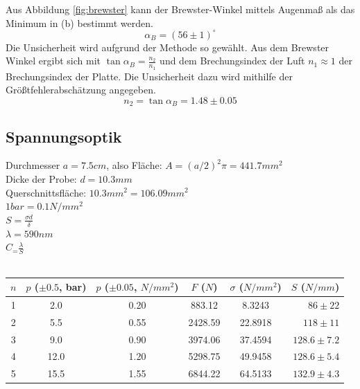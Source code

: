 \documentclass[twoside]{article}
\begin{document}
Aus Abbildung \ref{fig:brewster} kann der Brewster-Winkel mittels Augenmaß als das Minimum in (b) bestimmt werden.
$$\boxed{\alpha_B=(56 \pm 1)^\circ}$$
Die Unsicherheit wird aufgrund der Methode so gewählt.
Aus dem Brewster Winkel ergibt sich mit $\tan \alpha_B=\frac{n_2}{n_1}$ und dem Brechungsindex der Luft $n_1 \approx 1$ der Brechungsindex der Platte. Die Unsicherheit dazu wird mithilfe der Größtfehlerabschätzung angegeben.
$$\boxed{n_2=\tan \alpha_B=1.48 \pm 0.05}$$



\subsection{Spannungsoptik}
Durchmesser $a=7.5cm$, also Fläche: $A=(a/2)^2\pi=441.7mm^2$\\
Dicke der Probe: $d=10.3mm$\\
Querschnittsfläche: $10.3mm^2=106.09mm^2$\\
$1 bar = 0.1 N/mm^2$\\
$S=\frac{\sigma d}{\delta}$\\
$\lambda=590nm$\\
$C_=\frac{\lambda}{S}$\\
\\
\begin{table}[H]
\begin{center}
\begin{tabular}{|c|c|c|c|c|r|}
\hline
$n$ & $p$ ($\pm 0.5$, bar) & $p$ ($\pm 0.05$, $\si{N/mm^2}$) & $F$ ($N$) & $\sigma$ ($\si{N/mm^2}$) & $S$ ($\si{N/mm}$)\\
\hline
1 & 2.0 & 0.20 & 883.12 & 8.3243 & $86 \pm 22$\\
2 & 5.5 & 0.55 & 2428.59 & 22.8918 & $118 \pm 11$\\
3 & 9.0 & 0.90 & 3974.06 & 37.4594 & $128.6 \pm 7.2$\\
4 & 12.0 & 1.20 & 5298.75 & 49.9458 & $128.6 \pm 5.4$\\
5 & 15.5 & 1.55 & 6844.22 & 64.5133 & $132.9 \pm 4.3$\\
\hline
\end{tabular}
\end{center}
\end{table}
\vspace{0.5mm}
\end{document}
